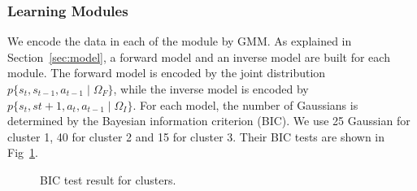 
\subsubsection{Learning Modules}
\label{sec:module}
We encode the data in each of the module by GMM. As explained in Section~\ref{sec:model}, a forward model and an inverse model are built for each module. The forward model is encoded by the joint distribution $p\{s_t,s_{t-1},a_{t-1}\mid\Omega_F\}$, while the inverse model is encoded by $p\{s_t,s{t+1},a_t,a_{t-1}\mid\Omega_I\}$. For each model, the number of Gaussians is determined by the Bayesian information criterion (BIC). We use 25 Gaussian for cluster 1, 40 for cluster 2 and 15 for cluster 3. Their BIC tests are shown in Fig~\ref{fig:bic}.

\begin{figure}
  \centering



  \caption{ \scriptsize{BIC test result for clusters. }
}

\label{fig:bic}
\end{figure}

